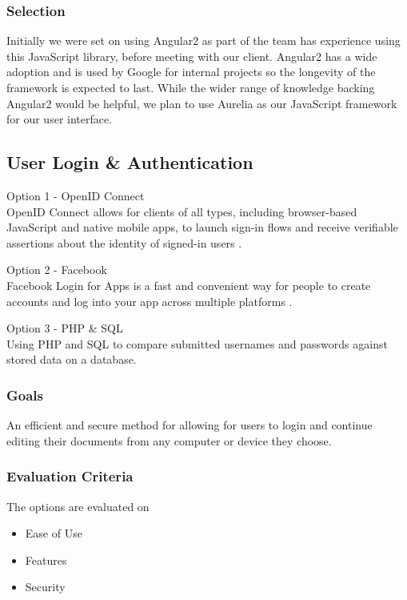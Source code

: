\documentclass[onecolumn, draftclsnofoot,10pt, compsoc]{IEEEtran}
\begin{document}
{\medskip
\subsubsection{Selection}
\noindent Initially we were set on using Angular2 as part of the team has experience using this JavaScript library, before meeting with our client. Angular2 has a wide adoption and is used by Google for internal projects so the longevity of the framework is expected to last. While the wider range of knowledge backing Angular2 would be helpful, we plan to use Aurelia as our JavaScript framework for our user interface.



\newpage
\subsection{User Login \& Authentication}
\noindent Option 1 - OpenID Connect \\
\noindent OpenID Connect allows for clients of all types, including browser-based JavaScript and native mobile apps, to launch sign-in flows and receive verifiable assertions about the identity of signed-in users \cite{OpenID}.

\medskip

\noindent Option 2 - Facebook  \\
\noindent Facebook Login for Apps is a fast and convenient way for people to create accounts and log into your app across multiple platforms \cite{Facebook}.

\medskip

\noindent Option 3 - PHP \& SQL \\
\noindent Using PHP and SQL to compare submitted usernames and passwords against stored data on a database.

\medskip

\subsubsection{Goals}
\noindent An efficient and secure method for allowing for users to login and continue editing their documents from any computer or device they choose.


\medskip

\subsubsection{Evaluation Criteria}
\noindent The options are evaluated on
\begin{itemize}
\item Ease of Use
\item Features
\item Security
\end{itemize}


}
\end{document}
